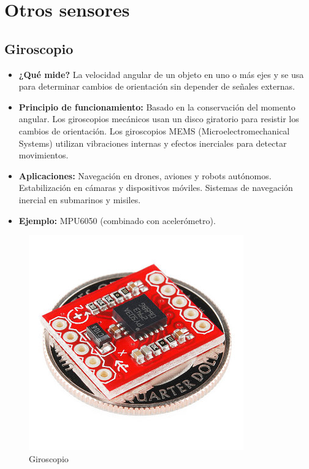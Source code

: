 \section{Otros sensores}

\subsection*{Giroscopio}
\begin{itemize}
	\item \textbf{¿Qué mide?} La velocidad angular de un objeto en uno o más ejes y se usa para determinar cambios de orientación sin depender de señales externas.
	\item \textbf{Principio de funcionamiento:} Basado en la conservación del momento angular.
	Los giroscopios mecánicos usan un disco giratorio para resistir los cambios de orientación.
	Los giroscopios MEMS (Microelectromechanical Systems) utilizan vibraciones internas y efectos inerciales para detectar movimientos.
	
	\item \textbf{Aplicaciones:} Navegación en drones, aviones y robots autónomos.
	Estabilización en cámaras y dispositivos móviles.
	Sistemas de navegación inercial en submarinos y misiles.
	\item \textbf{Ejemplo:} MPU6050 (combinado con acelerómetro).
	\cite{universalrobots_sensores_robótica}
\end{itemize}
\begin{figure}[h]
	\centering
	\includegraphics[width=0.3\linewidth]{img/giroscopio}
	\caption{Giroscopio}
	\label{fig:giroscopio}
\end{figure}


